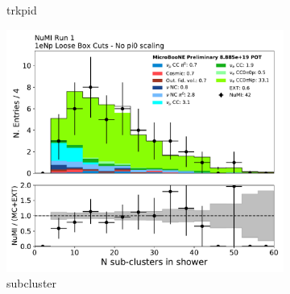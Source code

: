 \begin{figure}[H]
\begin{subfigure}{0.3\textwidth}
    \caption{trkpid}
    \end{subfigure}
    \begin{subfigure}{0.3\textwidth}
    \includegraphics[width=1.0\textwidth]{Sidebands/Figures/NuMI/1eNp/subcluster.pdf}
    \caption{subcluster}
    \end{subfigure}
    \caption{} 
    \label{fig:NuMI_1eNp_2}
\end{figure}

